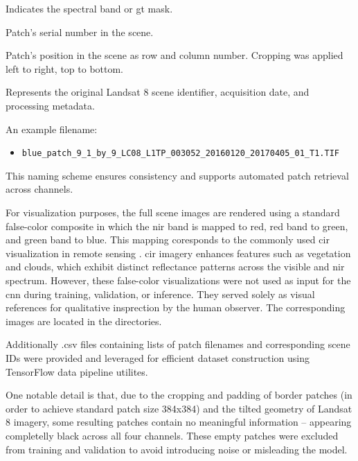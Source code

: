 {\begin{description}[style=sameline, labelwidth=4cm, labelsep=0.3cm, leftmargin=5cm, font=\normalfont\ttfamily\bfseries, itemsep=0pt, topsep=0pt, parsep=0pt, align=left]
  \item[band] Indicates the spectral band or \gls{gt} mask.
  \item[ID] Patch's serial number in the scene.
  \item[row \& col] Patch's position in the scene as row and column number. Cropping was applied left to right, top to bottom.
  \item[metadata] Represents the original Landsat 8 scene identifier, acquisition date, and processing metadata.
\end{description}

An example filename:

\begin{itemize}
  \item \texttt{blue\_patch\_9\_1\_by\_9\_LC08\_L1TP\_003052\_20160120\_20170405\_01\_T1.TIF}
\end{itemize}

This naming scheme ensures consistency and supports automated patch retrieval across channels.

For visualization purposes, the full scene images are rendered using a standard false-color composite in which the \gls{nir} band is mapped to red, red band to green, and green band to blue.
This mapping coresponds to the commonly used \gls{cir} visualization in remote sensing \cite{cir1}.
\gls{cir} imagery enhances features such as vegetation and clouds, which exhibit distinct reflectance patterns across the visible and \gls{nir} spectrum.
However, these false-color visualizations were not used as input for the \gls{cnn} during training, validation, or inference.
They served solely as visual references for qualitative insprection by the human observer.
The corresponding images are located in the  directories.


Additionally .csv files containing lists of patch filenames and corresponding scene IDs were provided and leveraged for efficient dataset construction using TensorFlow data pipeline utilites.

One notable detail is that, due to the cropping and padding of border patches (in order to achieve standard patch size 384x384) and the tilted geometry of Landsat 8 imagery, some resulting patches contain no meaningful information – appearing completelly black across all four channels. These empty patches were excluded from training and validation to avoid introducing noise or misleading the model.


}
